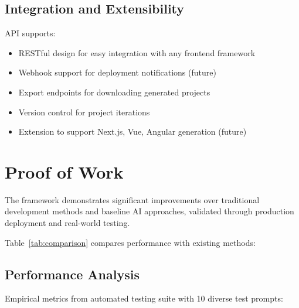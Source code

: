 \documentclass[10pt, conference, letterpaper]{IEEEtran}
\begin{document}
\subsection{Integration and Extensibility}
API supports:
\begin{itemize}
    \item RESTful design for easy integration with any frontend framework
    \item Webhook support for deployment notifications (future)
    \item Export endpoints for downloading generated projects
    \item Version control for project iterations
    \item Extension to support Next.js, Vue, Angular generation (future)
\end{itemize}

\section{Proof of Work}
The framework demonstrates significant improvements over traditional development methods and baseline AI approaches, validated through production deployment and real-world testing.

Table~\ref{tab:comparison} compares performance with existing methods:

\begin{table}[ht]
\centering
\caption{Comparison with Baseline Methods (Empirically Validated)}
\label{tab:comparison}
\end{table}

\subsection{Performance Analysis}
Empirical metrics from automated testing suite with 10 diverse test prompts:
\end{document}
